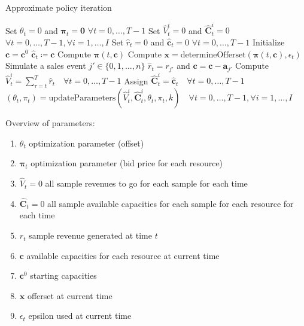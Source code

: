 \begin{algorithm}
	\caption{Approximate policy iteration}\label{alg-API}
	\begin{algorithmic}[1]
		\State Set $\theta_t = 0$ and $\mathbf{\pi}_t = \mathbf{0}$ $\forall t = 0, \dots, T-1$ \label{alg-API1}
		 \label{alg-API-Piter1}
		\State Set $\hat{V}_t^i = 0$ and $\mathbf{\hat{C}}_t^i = 0$ $\forall t = 0, \dots, T-1, \forall i = 1, \dots, I$\label{alg-API-Piter2}\label{alg-API3}
		\label{alg-API-Peval1}
		\State Set $\hat{r}_t = 0$ and $\mathbf{\hat{c}}_t = 0$ $\forall t = 0, \dots, T-1$\label{alg-API5}
		\State Initialize $\mathbf{c} = \mathbf{c}^0$\label{alg-API6}
		\State $\mathbf{\hat{c}}_t \coloneqq \mathbf{c}$\label{alg-API8}
		\State Compute $\mathbf{\pi}(t, \mathbf{c})$ \label{alg-API-calcPi}\label{alg-API9}
		\State Compute $\mathbf{x} = \text{determineOfferset}(\mathbf{\pi}(t, \mathbf{c}), \epsilon_t)$\label{alg-API10}
		\State Simulate a sales event $j' \in \{0, 1, \dots, n\}$\label{alg-API11}
		\State $\hat{r}_t = r_{j'}$ and $\mathbf{c} = \mathbf{c} - \mathbf{a}_{j'}$\label{alg-API13}
		\EndIf
		\EndFor
		\State Compute $\hat{V}_t^i = \sum_{\tau = t}^{T}\hat{r}_t \quad \forall t = 0, \dots, T-1$\label{alg-API14}
		\State Assign $\mathbf{\hat{C}}_t^i = \mathbf{\hat{c}}_t \quad \forall t = 0, \dots, T-1$\label{alg-API15} \label{alg-API-Peval2}
		\EndFor
		\State $\left(\theta_t, \pi_t \right) = \text{updateParameters}\left(\hat{V}_t^i, \mathbf{\hat{C}}_t^i, \theta_t, \pi_t, k\right) \quad \forall t = 0, \dots, T-1, \forall i = 1, \dots, I$ \label{alg-API-updateParam}\label{alg-API-Piter3}
		\EndFor
	\end{algorithmic}
\end{algorithm}


Overview of parameters:
\begin{enumerate}
	\item $\theta_t$	optimization parameter (offset)
	\item $\mathbf{\pi}_t$	optimization parameter (bid price for each resource)
	\item $\hat{V}_t = 0$	all sample revenues to go for each sample for each time
	\item $\mathbf{\hat{C}}_t = 0$	all sample available capacities for each sample for each resource for each time
	\item $r_t$	sample revenue generated at time $t$
	\item $\mathbf{c}$	available capacities for each resource at current time
	\item $\mathbf{c}^0$	starting capacities
	\item $\mathbf{x}$ offerset at current time
	\item $\epsilon_t$ epsilon used at current time
\end{enumerate}





